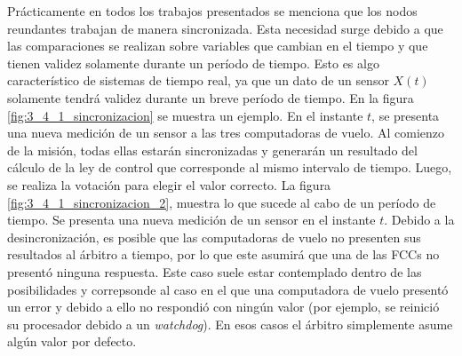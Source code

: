 Prácticamente en todos los trabajos presentados se menciona que los nodos reundantes trabajan de manera sincronizada. Esta necesidad surge debido a que las comparaciones se realizan sobre variables que cambian en el tiempo y que tienen validez solamente durante un período de tiempo. Esto es algo característico de sistemas de tiempo real, ya que un dato de un sensor $X(t)$ solamente tendrá validez durante un breve período de tiempo. 
En la figura \ref{fig:3_4_1_sincronizacion} se muestra un ejemplo. En el instante $t$, se presenta una nueva medición de un sensor a las tres computadoras de vuelo. Al comienzo de la misión, todas ellas estarán sincronizadas y generarán un resultado del cálculo de la ley de control que corresponde al mismo intervalo de tiempo. Luego, se realiza la votación para elegir el valor correcto. La figura \ref{fig:3_4_1_sincronizacion_2}, muestra lo que sucede al cabo de un período de tiempo. Se presenta una nueva medición de un sensor en el instante $t$. Debido a la desincronización, es posible que las computadoras de vuelo no presenten sus resultados al árbitro a tiempo, por lo que este asumirá que una de las FCCs no presentó ninguna respuesta. Este caso suele estar contemplado dentro de las posibilidades y correpsonde al caso en el que una computadora de vuelo presentó un error y debido a ello no respondió con ningún valor (por ejemplo, se reinició su procesador debido a un \textit{watchdog}). En esos casos el árbitro simplemente asume algún valor por defecto.

